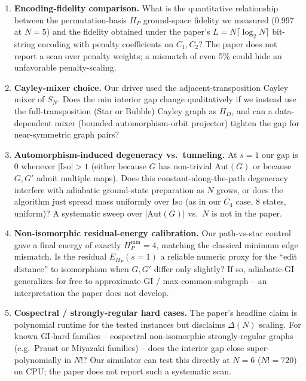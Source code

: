 \documentclass[11pt]{article}
\begin{document}
\begin{enumerate}
  \item[\textbf{Q1}] \textbf{Encoding-fidelity comparison.} What is the quantitative relationship between the permutation-basis $H_P$ ground-space fidelity we measured (0.997 at $N=5$) and the fidelity obtained under the paper's $L=N\lceil\log_2 N\rceil$ bit-string encoding with penalty coefficients on $C_1,C_2$? The paper does not report a scan over penalty weights; a mismatch of even 5\% could hide an unfavorable penalty-scaling.
  \item[\textbf{Q2}] \textbf{Cayley-mixer choice.} Our driver used the adjacent-transposition Cayley mixer of $S_N$. Does the min interior gap change qualitatively if we instead use the full-transposition (Star or Bubble) Cayley graph as $H_D$, and can a data-dependent mixer (bounded automorphism-orbit projector) tighten the gap for near-symmetric graph pairs?
  \item[\textbf{Q3}] \textbf{Automorphism-induced degeneracy vs.\ tunneling.} At $s=1$ our gap is 0 whenever $|\mathrm{Iso}|>1$ (either because $G$ has non-trivial $\mathrm{Aut}(G)$ or because $G,G'$ admit multiple maps). Does this constant-along-the-path degeneracy interfere with adiabatic ground-state preparation as $N$ grows, or does the algorithm just spread mass uniformly over $\mathrm{Iso}$ (as in our $C_4$ case, 8 states, uniform)? A systematic sweep over $|\mathrm{Aut}(G)|$ vs.\ $N$ is not in the paper.
  \item[\textbf{Q4}] \textbf{Non-isomorphic residual-energy calibration.} Our path-vs-star control gave a final energy of exactly $H_P^{\min}=4$, matching the classical minimum edge mismatch. Is the residual $E_{H_P}(s{=}1)$ a reliable numeric proxy for the ``edit distance'' to isomorphism when $G,G'$ differ only slightly? If so, adiabatic-GI generalizes for free to approximate-GI / max-common-subgraph -- an interpretation the paper does not develop.
  \item[\textbf{Q5}] \textbf{Cospectral / strongly-regular hard cases.} The paper's headline claim is polynomial runtime for the tested instances but disclaims $\Delta(N)$ scaling. For known GI-hard families -- cospectral non-isomorphic strongly-regular graphs (e.g.\ Praust or Miyazaki families) -- does the interior gap close super-polynomially in $N!$? Our simulator can test this directly at $N=6$ ($N!{=}720$) on CPU; the paper does not report such a systematic scan.
\end{enumerate}
\end{document}
